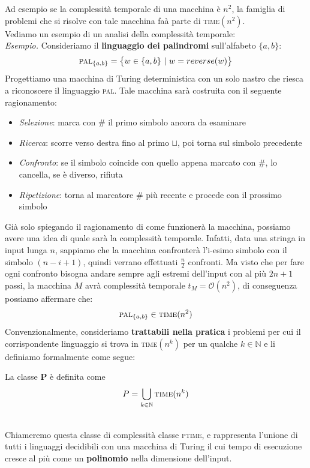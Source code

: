 Ad esempio se la complessità temporale di una macchina è $n^2$, la famiglia di problemi che si risolve con tale macchina faà parte di \textsc{time}$(n^2)$.\smallskip\\
Vediamo un esempio di un analisi della complessità temporale:\\
\textit{Esempio.} Consideriamo il \textbf{linguaggio dei palindromi} sull'alfabeto $\{ a,b\}$:
\[     \textsc{pal}_{\{ a,b\}}  = \big\{ w \in \{ a,b \} \ |\ w = reverse(w)     \big\}    \]
Progettiamo una macchina di Turing deterministica con un solo nastro che riesca a riconoscere il linguaggio \textsc{pal}. Tale macchina sarà costruita con il seguente ragionamento:
\begin{itemize}
    \item \textit{Selezione}: marca con $\#$ il primo simbolo ancora da esaminare
    \item \textit{Ricerca}: scorre verso destra fino al primo $\sqcup$, poi torna sul simbolo precedente
    \item \textit{Confronto}: se il simbolo coincide con quello appena marcato con $\#$, lo cancella, se è diverso, rifiuta
    \item \textit{Ripetizione}: torna al marcatore $\#$ più recente e procede con il prossimo simbolo 
\end{itemize}
Già solo spiegando il ragionamento di come funzionerà la macchina, possiamo avere una idea di quale sarà la complessità temporale. Infatti, data una stringa in input lunga $n$,
sappiamo che la macchina confronterà l'i-esimo simbolo con il simbolo $(n-i+1)$, quindi verrano effettuati $\frac{n}{2}$ confronti. Ma visto che per fare ogni confronto bisogna andare sempre agli estremi dell'input con al più $2n+1$ passi,
la macchina $M$ avrà complessità temporale $t_M = \mathcal{O}(n^2)$, di conseguenza possiamo affermare che:
\[   \textsc{pal}_{\{a,b\}} \in \textsc{time}(n^2)   \]
Convenzionalmente, consideriamo \textbf{trattabili nella pratica} i problemi per cui il corrispondente linguaggio si trova in \textsc{time}$(n^k)$ per un qualche $k \in \mathbb{N}$ e li definiamo formalmente come segue:\smallskip\\
\colorbox{SALZO}{\parbox{\dimexpr\linewidth-2\fboxsep}{\begin{definition}
   La classe \textbf{P} è definita come
   \[     P = \bigcup_{k \in \mathbb{N}} \textsc{time}(n^k)   \]
\end{definition}}}\smallskip\\
Chiameremo questa classe di complessità classe \textsc{ptime}, e rappresenta l'unione di tutti i linguaggi decidibili con una macchina di Turing il cui tempo di esecuzione cresce al più come un \textbf{polinomio} nella dimensione dell'input.
